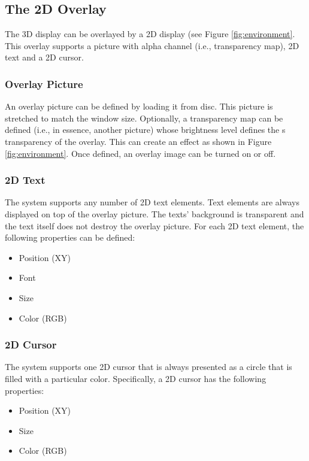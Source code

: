 \documentclass[letterpaper,oneside,12pt]{article}
\begin{document}
\subsection{The 2D Overlay}

The 3D display can be overlayed by a 2D display (see Figure 
\ref{fig:environment}. This overlay supports a picture with alpha channel (i.e., 
transparency map), 2D text and a 2D cursor.

\subsubsection{Overlay Picture}

An overlay picture can be defined by loading it from disc. This picture is 
stretched to match the window size. Optionally, a transparency map can be 
defined (i.e., in essence, another picture) whose brightness level defines the s
transparency of the overlay. This can create an effect as shown in Figure 
\ref{fig:environment}. Once defined, an overlay image can be turned on or off.

\subsubsection{2D Text}

The system supports any number of 2D text elements. Text elements are always 
displayed on top of the overlay picture. The texts' background is transparent 
and the text itself does not destroy the overlay picture. For each 2D text 
element, the following properties can be defined:

\begin{itemize}
 \item Position (XY)
 \item Font
 \item Size
 \item Color (RGB)
\end{itemize}


\subsubsection{2D Cursor}

The system supports one 2D cursor that is always presented as a circle
that is filled with a particular color. Specifically, a 2D cursor has
the following properties:

\begin{itemize}
 \item Position (XY)
 \item Size
 \item Color (RGB)
\end{itemize}
\end{document}
